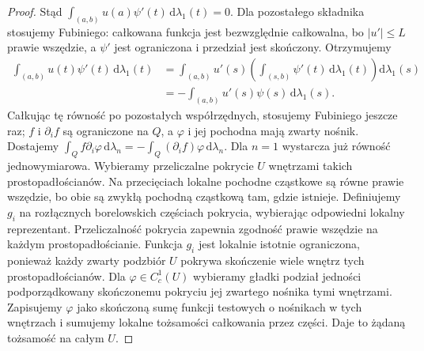 \begin{proof}
Stąd $\int_{(a,b)}u(a)\psi'(t)\,\mathrm d\lambda_1(t)=0$.
Dla pozostałego składnika stosujemy Fubiniego:
całkowana funkcja jest bezwzględnie całkowalna,
bo $|u'|\le L$ prawie wszędzie, a $\psi'$ jest
ograniczona i przedział jest skończony. Otrzymujemy
\begin{align*}
 \int_{(a,b)}u(t)\psi'(t)\,\mathrm d\lambda_1(t)
 &=\int_{(a,b)}u'(s)
    \left(\int_{(s,b)}\psi'(t)\,\mathrm d\lambda_1(t)\right)
    \mathrm d\lambda_1(s)\\
 &=-\int_{(a,b)}u'(s)\psi(s)\,\mathrm d\lambda_1(s).
\end{align*}
Całkując tę równość po pozostałych współrzędnych,
stosujemy Fubiniego jeszcze raz; $f$ i $\partial_i f$
są ograniczone na $Q$, a $\varphi$ i jej pochodna
mają zwarty nośnik. Dostajemy
$\int_Q f\partial_i\varphi\,\mathrm d\lambda_n
=-\int_Q(\partial_i f)\varphi\,\mathrm d\lambda_n$.
Dla $n=1$ wystarcza już równość jednowymiarowa.
Wybieramy przeliczalne pokrycie $U$ wnętrzami takich
prostopadłościanów. Na przecięciach lokalne pochodne
cząstkowe są równe prawie wszędzie, bo obie są zwykłą
pochodną cząstkową tam, gdzie istnieje. Definiujemy $g_i$
na rozłącznych borelowskich częściach pokrycia, wybierając
odpowiedni lokalny reprezentant. Przeliczalność pokrycia
zapewnia zgodność prawie wszędzie na każdym prostopadłościanie.
Funkcja $g_i$ jest lokalnie istotnie ograniczona, ponieważ
każdy zwarty podzbiór $U$ pokrywa skończenie wiele wnętrz
tych prostopadłościanów. Dla $\varphi\in C_c^1(U)$ wybieramy
gładki podział jedności podporządkowany skończonemu pokryciu
jej zwartego nośnika tymi wnętrzami. Zapisujemy $\varphi$
jako skończoną sumę funkcji testowych o nośnikach w tych
wnętrzach i sumujemy lokalne tożsamości całkowania przez
części. Daje to żądaną tożsamość na całym $U$.


\end{proof}
